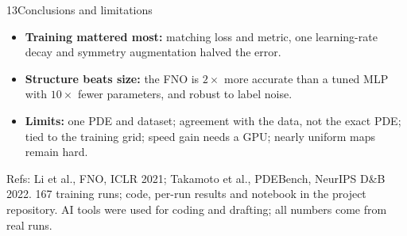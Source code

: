 \documentclass{article}
\newcommand{\smalltext}{\fontsize{20}{24}\selectfont}
\begin{document}
\begin{minipage}[t]{0.322\linewidth}
\begin{psec}[navy]{13\quad Conclusions and limitations}
\begin{itemize}
\item \textbf{Training mattered most:} matching loss and metric, one learning-rate decay and symmetry augmentation halved the error.
\item \textbf{Structure beats size:} the FNO is $2\times$ more accurate than a tuned MLP with $10\times$ fewer parameters, and robust to label noise.
\item \textbf{Limits:} one PDE and dataset; agreement with the data, not the exact PDE; tied to the training grid; speed gain needs a GPU; nearly uniform maps remain hard.
\end{itemize}
{\smalltext\color{grey} Refs: Li et al., FNO, ICLR 2021; Takamoto et al., PDEBench, NeurIPS D\&B 2022. 167 training runs; code, per-run results and notebook in the project repository. AI tools were used for coding and drafting; all numbers come from real runs.}
\end{psec}
\end{minipage}
\end{document}
